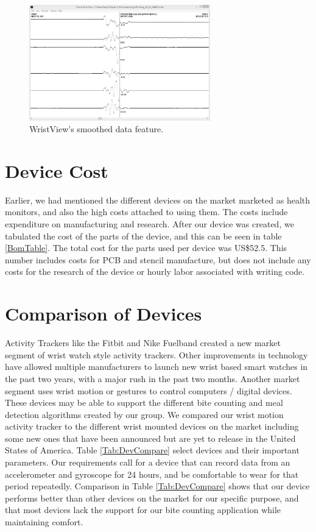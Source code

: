 \begin{figure}
\begin{center}
\includegraphics[width=0.7\textwidth]{images/WristSmooth.jpg}
\caption{WristView's smoothed data feature.}
\label{Fig:WristViewSoomth}
\end{center}
\end{figure}

\section{Device Cost}
\label{Sec:DevCost}
Earlier, we had mentioned the different devices on the market marketed as health monitors,
and also the high costs attached to using them.
The costs include expenditure on manufacturing and research.
After our device was created, 
we tabulated the cost of the parts of the device, and this can be seen in table \ref{BomTable}.
The total cost for the parts used per device was US\$52.5.
This number includes costs for PCB and stencil manufacture, but does not include any costs for the research of the device or hourly labor associated with writing code.


\section{Comparison of Devices}
\label{Sec:Comparison}
Activity Trackers like the Fitbit and Nike Fuelband created a new market segment of
wrist watch style activity trackers.
Other improvements in technology have allowed multiple manufacturers to launch new
wrist based smart watches in the past two years,
with a major rush in the past two months.
Another market segment uses wrist motion or gestures to control computers / digital devices.
These devices may be able to support the different bite counting and meal detection algorithms created by our group.
We compared our wrist motion activity tracker to the different wrist mounted devices on the market
including some new ones that have been announced but are yet to release in the United States of America.
Table \ref{Tab:DevCompare} select devices and their important parameters.
Our requirements call for a device that can record data from an accelerometer and gyroscope for 24 hours,
and be comfortable to wear for that period repeatedly. Comparison in Table \ref{Tab:DevCompare} shows that our device performs better than other devices on the market for our specific purpose, and that most devices lack the support for our bite counting application while maintaining comfort.
